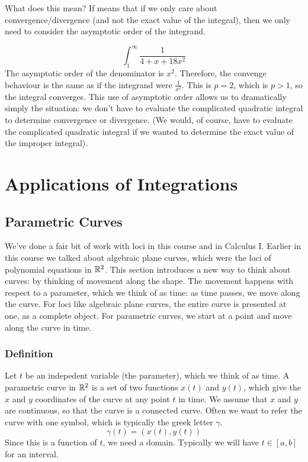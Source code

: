 \documentclass[fleqn]{report}
\begin{document}
What does this mean? If means that if we only care about
convergence/divergence (and not the exact value of the
integral), then we only need to consider the asymptotic order
of the integrand. 

\begin{example}
\begin{equation*}
\int_1^\infty \frac{1}{4 + x + 18x^2}
\end{equation*}
The asymptotic order of the denominator is $x^2$. Therefore,
the convenge behaviour is the same as if the integrand were
$\frac{1}{x^2}$. This is $p=2$, which is $p>1$, so the
integral converges. This use of asymptotic order allows us to
dramatically simply the situation: we don't have to evaluate
the complicated quadratic integral to determine convergence or
divergence. (We would, of course, have to evaluate the
complicated quadratic integral if we wanted to determine the
exact value of the improper integral).
\end{example}

\chapter{Applications of Integrations}
\label{integration-applications}

\section{Parametric Curves}
\label{parametric-curves}

We've done a fair bit of work with loci in this course and in
Calculus I. Earlier in this course we talked about algebraic
plane curves, which were the loci of polynomial equations in
$\mathbb{R}^2$. This section introduces a new way to think about
curves: by thinking of movement along the shape. The movement
happens with respect to a parameter, which we think of as
time: as time passes, we move along the curve. For loci like
algebraic plane curves, the entire curve is presented at one,
as a complete object. For parametric curves, we start at a
point and move along the curve in time.

\subsection{Definition}
\label{parametric-curves-definition}

\begin{defn}
Let $t$ be an indepedent variable (the parameter), which we
think of as time. A parametric curve in $\mathbb{R}^2$ is a set of
two functions $x(t)$ and $y(t)$, which give the $x$ and $y$
coordinates of the curve at any point $t$ in time. We assume
that $x$ and $y$ are continuous, so that the curve is a
connected curve. Often we want to refer the curve with one
symbol, which is typically the greek letter $\gamma$.
\begin{equation*}
\gamma(t) = (x(t), y(t))
\end{equation*}
Since this is a function of $t$, we need a domain. Typically
we will have $t \in [a,b]$ for an interval.
\end{defn}
\end{document}
